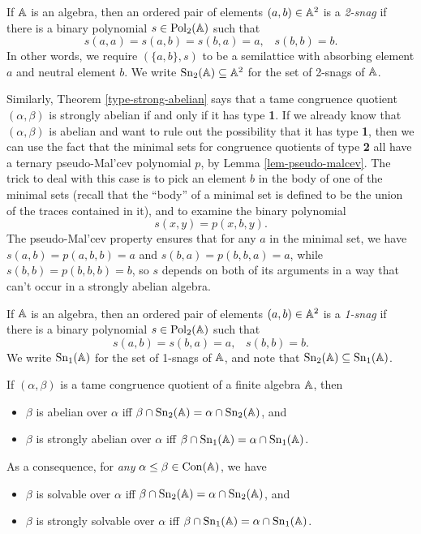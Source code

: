 \begin{appendices}
\begin{defn} If $\mathbb{A}$ is an algebra, then an ordered pair of elements $(a,b) \in \mathbb{A}^2$ is a \emph{2-snag} if there is a binary polynomial $s \in \operatorname{Pol}_2(\mathbb{A})$ such that
\[
s(a,a) = s(a,b) = s(b,a) = a, \;\;\; s(b,b) = b.
\]
In other words, we require $(\{a,b\},s)$ to be a semilattice with absorbing element $a$ and neutral element $b$. We write $\operatorname{Sn}_2(\mathbb{A}) \subseteq \mathbb{A}^2$ for the set of 2-snags of $\mathbb{A}$.
\end{defn}

Similarly, Theorem \ref{type-strong-abelian} says that a tame congruence quotient $(\alpha,\beta)$ is strongly abelian if and only if it has type \textbf{1}. If we already know that $(\alpha,\beta)$ is abelian and want to rule out the possibility that it has type \textbf{1}, then we can use the fact that the minimal sets for congruence quotients of type \textbf{2} all have a ternary pseudo-Mal'cev polynomial $p$, by Lemma \ref{lem-pseudo-malcev}. The trick to deal with this case is to pick an element $b$ in the body of one of the minimal sets (recall that the ``body'' of a minimal set is defined to be the union of the traces contained in it), and to examine the binary polynomial
\[
s(x,y) = p(x,b,y).
\]
The pseudo-Mal'cev property ensures that for any $a$ in the minimal set, we have $s(a,b) = p(a,b,b) = a$ and $s(b,a) = p(b,b,a) = a$, while $s(b,b) = p(b,b,b) = b$, so $s$ depends on both of its arguments in a way that can't occur in a strongly abelian algebra.

\begin{defn} If $\mathbb{A}$ is an algebra, then an ordered pair of elements $(a,b) \in \mathbb{A}^2$ is a \emph{1-snag} if there is a binary polynomial $s \in \operatorname{Pol}_2(\mathbb{A})$ such that
\[
s(a,b) = s(b,a) = a, \;\;\; s(b,b) = b.
\]
We write $\operatorname{Sn}_1(\mathbb{A})$ for the set of 1-snags of $\mathbb{A}$, and note that $\operatorname{Sn}_2(\mathbb{A}) \subseteq \operatorname{Sn}_1(\mathbb{A})$.
\end{defn}

\begin{thm} If $(\alpha,\beta)$ is a tame congruence quotient of a finite algebra $\mathbb{A}$, then
\begin{itemize}
\item $\beta$ is abelian over $\alpha$ iff $\beta \cap \operatorname{Sn}_2(\mathbb{A}) = \alpha \cap \operatorname{Sn}_2(\mathbb{A})$, and
\item $\beta$ is strongly abelian over $\alpha$ iff $\beta \cap \operatorname{Sn}_1(\mathbb{A}) = \alpha \cap \operatorname{Sn}_1(\mathbb{A})$.
\end{itemize}
As a consequence, for \emph{any} $\alpha \le \beta \in \operatorname{Con}(\mathbb{A})$, we have
\begin{itemize}
\item $\beta$ is solvable over $\alpha$ iff $\beta \cap \operatorname{Sn}_2(\mathbb{A}) = \alpha \cap \operatorname{Sn}_2(\mathbb{A})$, and
\item $\beta$ is strongly solvable over $\alpha$ iff $\beta \cap \operatorname{Sn}_1(\mathbb{A}) = \alpha \cap \operatorname{Sn}_1(\mathbb{A})$.
\end{itemize}
\end{thm}


\end{appendices}
